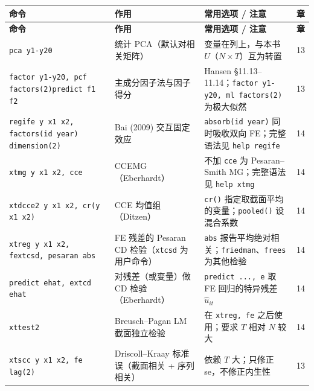 {\renewcommand{\arraystretch}{1.12}\begin{longtable}{@{}>{\raggedright\arraybackslash\small}p{5.3cm}>{\raggedright\arraybackslash\small}p{3.8cm}>{\raggedright\arraybackslash\small}p{5.3cm}>{\centering\arraybackslash\small}p{0.9cm}@{}}
\toprule
\textbf{命令} & \textbf{作用} & \textbf{常用选项 / 注意} & \textbf{章}\\
\midrule
\endfirsthead
\toprule
\textbf{命令} & \textbf{作用} & \textbf{常用选项 / 注意} & \textbf{章}\\
\midrule
\endhead
\bottomrule
\endlastfoot

\texttt{pca y1-y20} & 统计 PCA（默认对相关矩阵） & 变量在列上，与本书 $U$（$N\times T$）互为转置 & 13\\
\addlinespace[1pt]
\texttt{factor y1-y20, pcf factors(2)}\newline \texttt{predict f1 f2} & 主成分因子法与因子得分 & Hansen §11.13–11.14；\texttt{factor y1-y20, ml factors(2)} 为极大似然 & 13\\
\addlinespace[1pt]
\texttt{regife y x1 x2, factors(id year) dimension(2)}\newline {\footnotesize\rmfamily [SSC]} & Bai (2009) 交互固定效应 & \texttt{absorb(id year)} 同时吸收双向 FE；完整语法见 \texttt{help regife} & 14\\
\addlinespace[1pt]
\texttt{xtmg y x1 x2, cce}\newline {\footnotesize\rmfamily [SSC]} & CCEMG（Eberhardt） & 不加 \texttt{cce} 为 Pesaran–Smith MG；完整语法见 \texttt{help xtmg} & 14\\
\addlinespace[1pt]
\texttt{xtdcce2 y x1 x2, cr(y x1 x2)}\newline {\footnotesize\rmfamily [SSC]} & CCE 均值组（Ditzen） & \texttt{cr()} 指定取截面平均的变量；\texttt{pooled()} 设混合系数 & 14\\
\addlinespace[1pt]
\texttt{xtreg y x1 x2, fe}\newline \texttt{xtcsd, pesaran abs}\newline {\footnotesize\rmfamily [SSC]} & FE 残差的 Pesaran CD 检验（\texttt{xtcsd} 为用户命令） & \texttt{abs} 报告平均绝对相关；\texttt{friedman}、\texttt{frees} 为其他检验 & 14\\
\addlinespace[1pt]
\texttt{predict ehat, e}\newline \texttt{xtcd ehat}\newline {\footnotesize\rmfamily [SSC]} & 对残差（或变量）做 CD 检验（Eberhardt） & \texttt{predict ..., e} 取 FE 回归的特异残差 $\hat u_{it}$ & 14\\
\addlinespace[1pt]
\texttt{xttest2}\newline {\footnotesize\rmfamily [SSC]} & Breusch–Pagan LM 截面独立检验 & 在 \texttt{xtreg, fe} 之后使用；要求 $T$ 相对 $N$ 较大 & 14\\
\addlinespace[1pt]
\texttt{xtscc y x1 x2, fe lag(2)}\newline {\footnotesize\rmfamily [SSC]} & Driscoll–Kraay 标准误（截面相关 + 序列相关） & 依赖 $T$ 大；只修正 se，不修正内生性 & 13\\
\end{longtable}}


